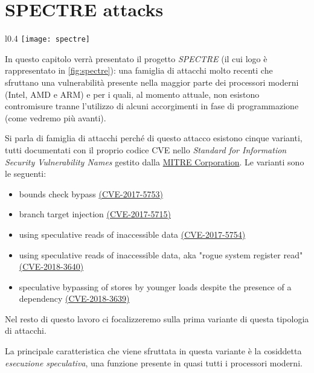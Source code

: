 \chapter{SPECTRE attacks}

	\begin{wrapfigure}{l}{0.4\textwidth}
		\texttt{[image: spectre]}
		\caption{il logo di SPECTRE}
		\label{fig:spectre}
	\end{wrapfigure}

	In questo capitolo verrà presentato il progetto \emph{SPECTRE}\cite{kocher2018spectre} (il cui logo è rappresentato in \cref{fig:spectre}): una famiglia di attacchi molto recenti che sfruttano una vulnerabilità presente nella maggior parte dei processori moderni (Intel, AMD e ARM) e per i quali, al momento attuale, non esistono contromisure tranne l'utilizzo di alcuni accorgimenti in fase di programmazione (come vedremo più avanti).
	
	Si parla di famiglia di attacchi perché di questo attacco esistono cinque varianti, tutti documentati con il proprio codice \ac{CVE} nello \emph{Standard for Information Security Vulnerability Names} gestito dalla \href{https://www.mitre.org/}{MITRE Corporation}. Le varianti sono le seguenti:
	
	\begin{itemize}
		\item [v1:] bounds check bypass \href{https://cve.mitre.org/cgi-bin/cvename.cgi?name=CVE-2017-5753}{(CVE-2017-5753)}
		\item [v2:] branch target injection \href{https://cve.mitre.org/cgi-bin/cvename.cgi?name=CVE-2017-5715}{(CVE-2017-5715)}
		\item [v3:] using speculative reads of inaccessible data \href{https://cve.mitre.org/cgi-bin/cvename.cgi?name=CVE-2017-5754}{(CVE-2017-5754)}
		\item [v3a:] using speculative reads of inaccessible data, aka "rogue system register read" \href{https://cve.mitre.org/cgi-bin/cvename.cgi?name=CVE-2018-3640}{(CVE-2018-3640)}
		\item [v4:] speculative bypassing of stores by younger loads despite the presence of a dependency \href{https://cve.mitre.org/cgi-bin/cvename.cgi?name=CVE-2018-3639}{(CVE-2018-3639)}
	\end{itemize}
	
	Nel resto di questo lavoro ci focalizzeremo sulla prima variante di questa tipologia di attacchi.
	
	La principale caratteristica che viene sfruttata in questa variante è la cosiddetta \emph{esecuzione speculativa}, una funzione presente in quasi tutti i processori moderni.
	
